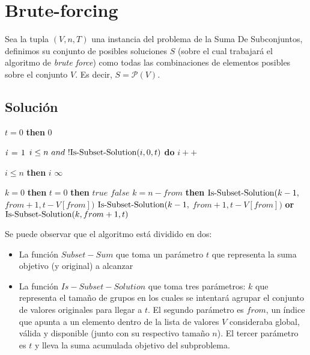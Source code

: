 \section{Brute-forcing}
Sea la tupla $(V, n, T)$ una instancia del problema de la Suma De Subconjuntos, definimos su conjunto de posibles soluciones $S$ (sobre el cual trabajará el algoritmo de \textit{brute force}) como todas las combinaciones de elementos posibles sobre el conjunto $V$. Es decir, $S = \mathcal{P}(V)$.

\subsection{Solución}
\begin{center}
	\begin{minipage}[t]{.49\textwidth}
		\raggedright
		\begin{codebox}
				\li \If $t = 0$ \textbf{then} \Return $0$
				\zi

				\li $\id{i} \gets 1$
				\li \While $i \leq n \ and \ !\func{Is-Subset-Solution}(i, 0, t)$ \textbf{do}
				\Do
					\li $i++$
					\zi
				\End

				\li \If $i \leq n$ \textbf{then}
				\li \Then
					\Return $i$
					\li
				\Else
					\li \Return $\infty$
				\End
			\End
		\end{codebox}
	\end{minipage}%
	\begin{minipage}[t]{.5\textwidth}
		\raggedleft
		\begin{codebox}
			\Procname{$\proc{Is-Subset-Solution}(k, \ from, \ t)$}
				\li \If $k = 0$ \textbf{then}
				\Then
					\li \If $t = 0$ \textbf{then}
					\li \Then
						\Return $true$
					\li \Else
						\li \Return $false$
					\End
				\li \Else
					\li \If $k = n - from$ \textbf{then}
					\li \Then
						\Return $\func{Is-Subset-Solution}(k - 1,$
						\zi $from + 1, t - V[from])$
					\li \Else
						\li \Return $\func{Is-Subset-Solution}(k - 1,$
						\zi $from + 1, t - V[from])$ \textbf{or}
						\zi $\func{Is-Subset-Solution}(k, from + 1, t)$
					\End
				\End
			\End
		\end{codebox}
		\label{fig:alg-bruteforce}
	\end{minipage}
\end{center}
Se puede observar que el algoritmo está dividido en dos:
\begin{itemize}
	\item La función $Subset-Sum$ que toma un parámetro $t$ que representa la suma objetivo (y original) a alcanzar
	\item La función $Is-Subset-Solution$ que toma tres parámetros: $k$ que representa el tamaño de grupos en los cuales se intentará agrupar el conjunto de valores originales para llegar a $t$. El segundo parámetro es $from$, un índice que apunta a un elemento dentro de la lista de valores $V$ consideraba global, válida y disponible (junto con su respectivo tamaño $n$). El tercer parámetro es $t$ y lleva la suma acumulada objetivo del subproblema.
\end{itemize}


